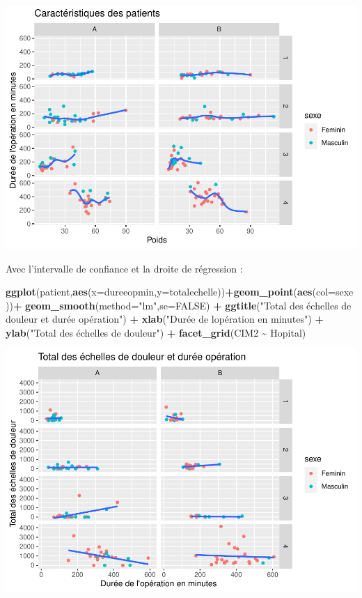 \documentclass[
]{book}
\newenvironment{Shaded}{\begin{snugshade}}{\end{snugshade}}
\newcommand{\AttributeTok}[1]{\textcolor[rgb]{0.13,0.29,0.53}{#1}}
\newcommand{\ConstantTok}[1]{\textcolor[rgb]{0.56,0.35,0.01}{#1}}
\newcommand{\FunctionTok}[1]{\textcolor[rgb]{0.13,0.29,0.53}{\textbf{#1}}}
\newcommand{\NormalTok}[1]{#1}
\newcommand{\SpecialCharTok}[1]{\textcolor[rgb]{0.81,0.36,0.00}{\textbf{#1}}}
\newcommand{\StringTok}[1]{\textcolor[rgb]{0.31,0.60,0.02}{#1}}
\begin{document}
\includegraphics{_main_files/figure-latex/ggplot19-1.pdf}

Avec l'intervalle de confiance et la droite de régression :

\begin{Shaded}
\begin{Highlighting}[]
\FunctionTok{ggplot}\NormalTok{(patient,}\FunctionTok{aes}\NormalTok{(}\AttributeTok{x=}\NormalTok{dureeopmin,}\AttributeTok{y=}\NormalTok{totalechelle))}\SpecialCharTok{+}\FunctionTok{geom\_point}\NormalTok{(}\FunctionTok{aes}\NormalTok{(}\AttributeTok{col=}\NormalTok{sexe))}\SpecialCharTok{+}
  \FunctionTok{geom\_smooth}\NormalTok{(}\AttributeTok{method=}\StringTok{"lm"}\NormalTok{,}\AttributeTok{se=}\ConstantTok{FALSE}\NormalTok{) }\SpecialCharTok{+}
  \FunctionTok{ggtitle}\NormalTok{(}\StringTok{"Total des échelles de douleur et durée opération"}\NormalTok{) }\SpecialCharTok{+} 
  \FunctionTok{xlab}\NormalTok{(}\StringTok{"Durée de l\textquotesingle{}opération en minutes"}\NormalTok{) }\SpecialCharTok{+} 
  \FunctionTok{ylab}\NormalTok{(}\StringTok{"Total des échelles de douleur"}\NormalTok{) }\SpecialCharTok{+}
  \FunctionTok{facet\_grid}\NormalTok{(CIM2 }\SpecialCharTok{\textasciitilde{}}\NormalTok{ Hopital)}
\end{Highlighting}
\end{Shaded}

\includegraphics{_main_files/figure-latex/ggplot20-1.pdf}
\end{document}
